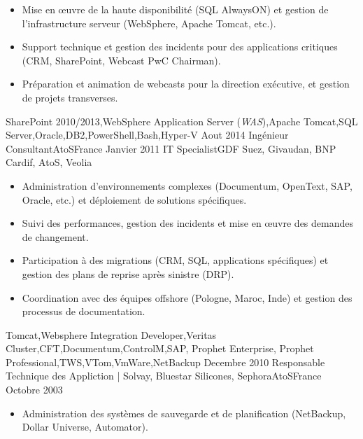 \begin{experiences}
{\begin{itemize}
                        \item Mise en œuvre de la haute disponibilité (SQL AlwaysON) et gestion de l'infrastructure serveur (WebSphere, Apache Tomcat, etc.).                
                        \item Support technique et gestion des incidents pour des applications critiques (CRM, SharePoint, Webcast PwC Chairman).                   
                        \item Préparation et animation de webcasts pour la direction exécutive, et gestion de projets transverses.                          
                      \end{itemize}
                    }
                    {SharePoint 2010/2013,WebSphere Application Server (\emph{WAS}),Apache Tomcat,SQL Server,Oracle,DB2,PowerShell,Bash,Hyper-V}
  \emptySeparator
  \consultantexperience
  {Aout 2014}       {Ingénieur Consultant}{AtoS}{France}
  {Janvier 2011}   {IT Specialist}{GDF Suez, Givaudan, BNP Cardif, AtoS, Veolia}
                    {
                      \begin{itemize}
                        \item Administration d'environnements complexes (Documentum, OpenText, SAP, Oracle, etc.) et déploiement de solutions spécifiques.
                        \item Suivi des performances, gestion des incidents et mise en œuvre des demandes de changement.
                        \item Participation à des migrations (CRM, SQL, applications spécifiques) et gestion des plans de reprise après sinistre (DRP).
                        \item Coordination avec des équipes offshore (Pologne, Maroc, Inde) et gestion des processus de documentation.
                      \end{itemize}
                    }
                    {Tomcat,Websphere Integration Developer,Veritas Cluster,CFT,Documentum,ControlM,SAP, Prophet Enterprise, Prophet Professional,TWS,VTom,VmWare,NetBackup}
  \emptySeparator         
  \experience
  {Decembre 2010}  {Responsable Technique des Appliction | Solvay, Bluestar Silicones, Sephora}{AtoS}{France}
  {Octobre 2003}   {
                      \begin{itemize}
                        \item Administration des systèmes de sauvegarde et de planification (NetBackup, Dollar Universe, Automator).                                            

\end{itemize}}
\end{experiences}
